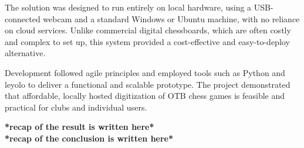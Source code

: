 The solution was designed to run entirely on local hardware, using a USB-connected webcam and a standard Windows or Ubuntu machine, with no reliance on cloud services. Unlike commercial digital chessboards, which are often costly and complex to set up, this system provided a cost-effective and easy-to-deploy alternative.

Development followed agile principles and employed tools such as Python and \acrshort{leyolo} to deliver a functional and scalable prototype. The project demonstrated that affordable, locally hosted digitization of OTB chess games is feasible and practical for clubs and individual users.

\textbf{*recap of the result is written here*}\\

\textbf{*recap of the conclusion is written here*}